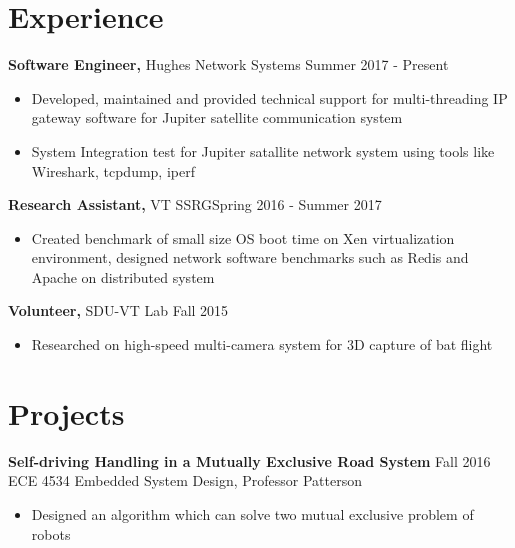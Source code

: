 \documentclass[margin]{res}
\begin{document}
\begin{resume}
  
\section{Experience} %

 {\bf Software Engineer,} Hughes Network Systems \hfill Summer 2017 - Present
 \begin{itemize} \itemsep -2pt  %
 \item Developed, maintained and provided technical support for multi-threading IP gateway software
	 for Jupiter satellite communication system
 \item System Integration test for Jupiter satallite network system using tools like Wireshark, tcpdump, iperf
 \end{itemize}

 {\bf Research Assistant,} VT SSRG\hfill Spring 2016 - Summer 2017
 \begin{itemize} \itemsep -2pt  %
 \item Created benchmark of small size OS boot time on Xen virtualization environment,
	   designed network software benchmarks such as Redis and Apache on distributed system
 \end{itemize}

{\bf Volunteer,} SDU-VT Lab \hfill  Fall 2015
\begin{itemize} \itemsep -2pt %
\item Researched on high-speed multi-camera system for 3D capture of bat flight
\end{itemize}




\section{Projects} 
               {\bf Self-driving Handling in a Mutually Exclusive Road System}     \hfill         Fall 2016  \\           
                {ECE 4534 Embedded System Design, Professor Patterson} 
                 \begin{itemize} \itemsep -2pt
                 \item Designed an algorithm which can solve two mutual exclusive problem of robots
                 

\end{itemize}
\end{resume}
\end{document}
